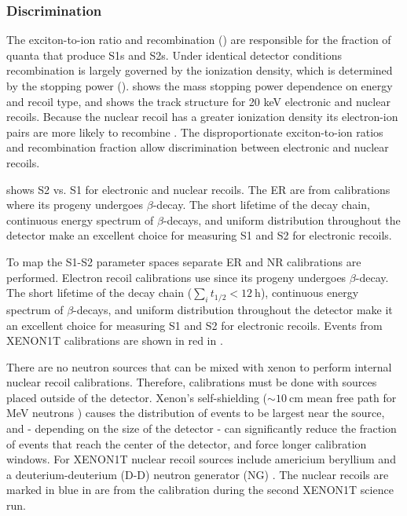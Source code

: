 \subsubsection{Discrimination}
\label{subsubsec:tpcs_signals_discr}
The exciton-to-ion ratio and recombination () are responsible for the fraction of quanta that produce S1s
and S2s.  Under identical
detector conditions recombination is largely governed by the ionization density, which is determined by the stopping power
().   shows the mass stopping power dependence on energy and recoil type,
and  shows the track structure for 20 keV electronic and nuclear recoils.  Because the nuclear recoil has
a greater ionization density its electron-ion pairs are more likely to recombine .  The disproportionate exciton-to-ion
ratios and recombination fraction allow discrimination between electronic and nuclear recoils.

 shows S2 vs. S1 for electronic and nuclear recoils.  The ER are from  calibrations
where its progeny  undergoes $\beta$-decay.  The short lifetime of the  decay chain, continuous energy spectrum
of $\beta$-decays, and uniform distribution throughout the detector make  an excellent choice for measuring S1 and S2 for
electronic recoils.

To map the S1-S2 parameter spaces separate ER and NR calibrations are performed.  Electron recoil calibrations use  since
its progeny  undergoes $\beta$-decay.  The short lifetime of the  decay chain
($\sum_i t_{1/2} < 12\ \mathrm{h}$), continuous energy spectrum
of $\beta$-decays, and uniform distribution throughout the detector make it an excellent choice for measuring S1 and S2 for
electronic recoils.  Events from XENON1T calibrations are shown in red in .

There are no neutron sources that can be mixed with xenon to perform internal nuclear recoil calibrations.  Therefore, calibrations
must be done with sources placed outside of the detector.  Xenon's self-shielding (${\sim}10\ \mathrm{cm}$ mean free path for MeV
neutrons ) causes the distribution of events to be largest near
the source, and - depending on the size of the detector - can significantly reduce the fraction of events that reach the center of the
detector, and force longer calibration windows.  For XENON1T nuclear recoil sources include
americium beryllium  and a deuterium-deuterium (D-D) neutron generator (NG) .  The nuclear recoils are
marked in blue in  are from the \ambe calibration during the second XENON1T science run.

